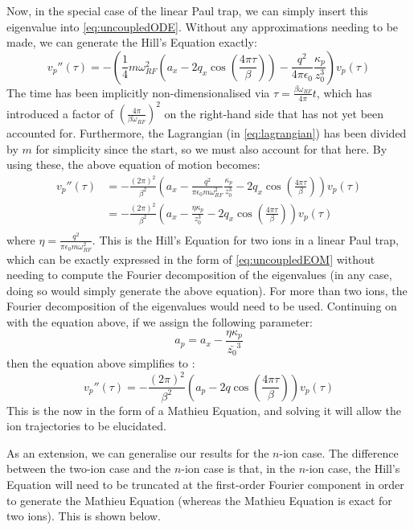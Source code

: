\documentclass{article}
\begin{document}
Now, in the special case of the linear Paul trap, we can simply insert this eigenvalue into \eqref{eq:uncoupledODE}. Without any approximations needing to be made, we can generate the Hill's Equation exactly:
\begin{equation*}
v_p'' (\tau) = - \left( \frac{1}{4} m \omega_{RF}^2 \left(a_x - 2 q_x \cos(\frac{4 \pi \tau}{\beta}) \right) - \frac{q^2}{4 \pi \epsilon_0} \frac{\kappa_p}{z_0^3} \right) v_p (\tau)
\end{equation*}
The time has been implicitly non-dimensionalised via $\tau = \frac{\beta \omega_{RF}}{4 \pi} t$, which has introduced a factor of $\left( \frac{4 \pi}{\beta \omega_{RF}} \right)^2$ on the right-hand side that has not yet been accounted for. Furthermore, the Lagrangian (in \eqref{eq:lagrangian}) has been divided by $m$ for simplicity since the start, so we must also account for that here. By using these, the above equation of motion becomes:
\begin{align*}
	v_p'' (\tau) & = - \frac{(2 \pi)^2}{\beta^2} \left(a_x - \frac{q^2}{\pi \epsilon_0  m \omega_{RF}^2} \frac{\kappa_p}{z_0^3} - 2 q_x \cos(\frac{4 \pi \tau}{\beta})  \right) v_p (\tau) \\
	& = - \frac{(2 \pi)^2}{\beta^2} \left(a_x - \frac{\eta \kappa_p}{z_0^3} - 2 q_x \cos( \frac{4 \pi \tau}{\beta} ) \right) v_p (\tau) \\
\end{align*}
where $\eta = \frac{q^2}{\pi \epsilon_0  m \omega_{RF}^2}$. This is the Hill's Equation for two ions in a linear Paul trap, which can be exactly expressed in the form of \eqref{eq:uncoupledEOM} without needing to compute the Fourier decomposition of the eigenvalues (in any case, doing so would simply generate the above equation). For more than two ions, the Fourier decomposition of the eigenvalues would need to be used. Continuing on with the equation above, if we assign the following parameter:
\begin{equation}
a_p = a_x - \frac{\eta \kappa_p}{\bar{z_0}^3}	
\end{equation}
then the equation above simplifies to :
\begin{equation}
v_p '' (\tau) = - \frac{(2 \pi)^2}{\beta^2} \left( a_p - 2 q \cos \left( \frac{4 \pi \tau}{\beta} \right) \right)	 v_p (\tau)
\end{equation}
This is the now in the form of a Mathieu Equation, and solving it will allow the ion trajectories to be elucidated. \par
\medskip
\noindent As an extension, we can generalise our results for the $n$-ion case. The difference between the two-ion case and the $n$-ion case is that, in the $n$-ion case, the Hill's Equation will need to be truncated at the first-order Fourier component in order to generate the Mathieu Equation (whereas the Mathieu Equation is exact for two ions). This is shown below. \par
\end{document}
